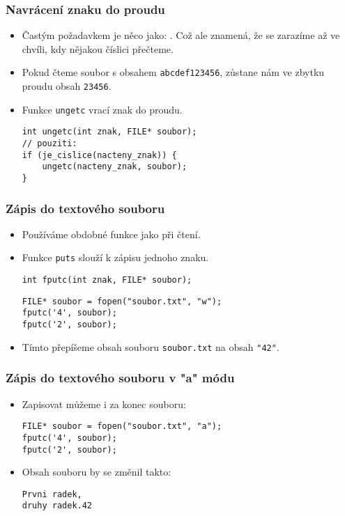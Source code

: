 \documentclass{beamer}
\newenvironment{itemizex}%
  {\large \begin{itemize}%
    \setlength{\itemsep}{8pt}%
    \setlength{\parskip}{8pt}}%
  {\end{itemize}}
\newenvironment{itemizey}%
  {\large \begin{itemize}%
    \setlength{\itemsep}{6pt}%
    \setlength{\parskip}{6pt}}%
  {\end{itemize}}
\begin{document}
\begin{frame}[t,fragile]\frametitle{Navrácení znaku do proudu} 
    \begin{itemizey}
        \item Častým požadavkem je něco jako: . Což ale znamená, že se zarazíme až ve chvíli, kdy nějakou číslici přečteme.
        \item Pokud čteme soubor s obsahem \texttt{abcdef123456}, zůstane nám ve zbytku proudu obsah \texttt{23456}.
        \item Funkce \texttt{ungetc} vrací znak do proudu. 
\begin{verbatim} 
int ungetc(int znak, FILE* soubor);
// pouziti:
if (je_cislice(nacteny_znak)) {
    ungetc(nacteny_znak, soubor);
}
\end{verbatim}
    \end{itemizey}
\end{frame}


\begin{frame}[t,fragile]\frametitle{Zápis do textového souboru} 
    \begin{itemizex}
        \item Používáme obdobné funkce jako při čtení.
        \item Funkce \texttt{puts} slouží k zápisu jednoho znaku.
\begin{verbatim} 
int fputc(int znak, FILE* soubor);
\end{verbatim}

\begin{verbatim} 
FILE* soubor = fopen("soubor.txt", "w");
fputc('4', soubor);
fputc('2', soubor);
\end{verbatim}
        \item Tímto přepíšeme obsah souboru \texttt{soubor.txt} na obsah \texttt{"42"}.
    \end{itemizex}
\end{frame}


\begin{frame}[t,fragile]\frametitle{Zápis do textového souboru v "a" módu} 
    \begin{itemizex}
        \item Zapisovat můžeme i za konec souboru:
\begin{verbatim} 
FILE* soubor = fopen("soubor.txt", "a");
fputc('4', soubor);
fputc('2', soubor);
\end{verbatim}
        \item Obsah souboru by se změnil takto:
\begin{verbatim} 
Prvni radek,
druhy radek.42
\end{verbatim}
    \end{itemizex}
\end{frame}
\end{document}
